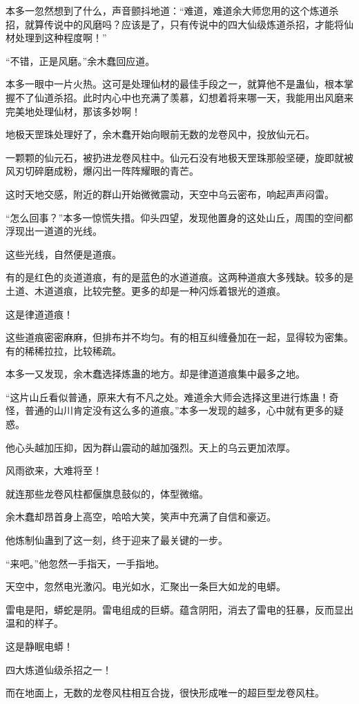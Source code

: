 \begin{this_body}
本多一忽然想到了什么，声音颤抖地道：“难道，难道余大师您用的这个炼道杀招，就算传说中的风磨吗？应该是了，只有传说中的四大仙级炼道杀招，才能将仙材处理到这种程度啊！”

“不错，正是风磨。”余木蠢回应道。

本多一眼中一片火热。这可是处理仙材的最佳手段之一，就算他不是蛊仙，根本掌握不了仙道杀招。此时内心中也充满了羡慕，幻想着将来哪一天，我能用出风磨来完美地处理仙材，那该多妙啊！

地极天罡珠处理好了，余木蠢开始向眼前无数的龙卷风中，投放仙元石。

一颗颗的仙元石，被扔进龙卷风柱中。仙元石没有地极天罡珠那般坚硬，旋即就被风刃切碎磨成粉，爆闪出一阵阵耀眼的青芒。

这时天地交感，附近的群山开始微微震动，天空中乌云密布，响起声声闷雷。

“怎么回事？”本多一惊慌失措。仰头四望，发现他置身的这处山丘，周围的空间都浮现出一道道的光线。

这些光线，自然便是道痕。

有的是红色的炎道道痕，有的是蓝色的水道道痕。这两种道痕大多残缺。较多的是土道、木道道痕，比较完整。更多的却是一种闪烁着银光的道痕。

这是律道道痕！

这些道痕密密麻麻，但排布并不均匀。有的相互纠缠叠加在一起，显得较为密集。有的稀稀拉拉，比较稀疏。

本多一又发现，余木蠢选择炼蛊的地方。却是律道道痕集中最多之地。

“这片山丘看似普通，原来大有不凡之处。难道余大师会选择这里进行炼蛊！奇怪，普通的山川肯定没有这么多的道痕。”本多一发现的越多，心中就有更多的疑惑。

他心头越加压抑，因为群山震动的越加强烈。天上的乌云更加浓厚。

风雨欲来，大难将至！

就连那些龙卷风柱都偃旗息鼓似的，体型微缩。

余木蠢却昂首身上高空，哈哈大笑，笑声中充满了自信和豪迈。

他炼制仙蛊到了这一刻，终于迎来了最关键的一步。

“来吧。”他忽然一手指天，一手指地。

天空中，忽然电光激闪。电光如水，汇聚出一条巨大如龙的电蟒。

雷电是阳，蟒蛇是阴。雷电组成的巨蟒。蕴含阴阳，消去了雷电的狂暴，反而显出温和的样子。

这是静眠电蟒！

四大炼道仙级杀招之一！

而在地面上，无数的龙卷风柱相互合拢，很快形成唯一的超巨型龙卷风柱。


\end{this_body}
